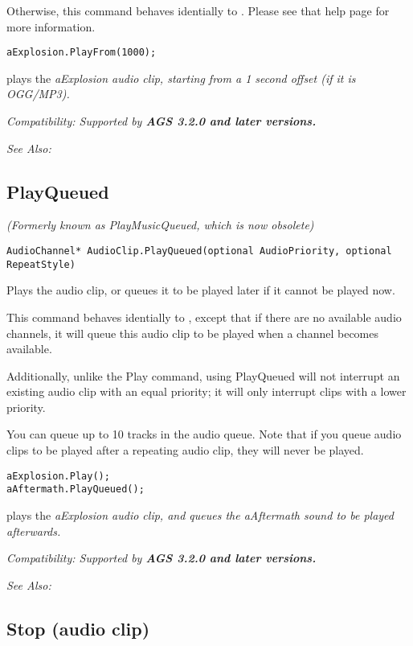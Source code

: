 Otherwise, this command behaves identially to .
Please see that help page for more information.

\begin{verbatim}
aExplosion.PlayFrom(1000);
\end{verbatim}
plays the \it{aExplosion} audio clip, starting from a 1 second offset (if it is OGG/MP3).

\it{Compatibility:} Supported by \bf{AGS 3.2.0} and later versions.

\it{See Also:} 


\subsection{PlayQueued}\label{AudioClip.PlayQueued}%

\it{(Formerly known as PlayMusicQueued, which is now obsolete)}

\begin{verbatim}
AudioChannel* AudioClip.PlayQueued(optional AudioPriority, optional RepeatStyle)
\end{verbatim}
Plays the audio clip, or queues it to be played later if it cannot be played now.

This command behaves identially to ,
except that if there are no available audio channels, it will queue this audio clip
to be played when a channel becomes available.

Additionally, unlike the Play command, using PlayQueued will not interrupt an existing audio
clip with an equal priority; it will only interrupt clips with a lower priority.

You can queue up to 10 tracks in the audio queue. Note that if you queue audio clips to
be played after a repeating audio clip, they will never be played.

\begin{verbatim}
aExplosion.Play();
aAftermath.PlayQueued();
\end{verbatim}
plays the \it{aExplosion} audio clip, and queues the \it{aAftermath} sound to be played
afterwards.

\it{Compatibility:} Supported by \bf{AGS 3.2.0} and later versions.

\it{See Also:} 


\subsection{Stop (audio clip)}\label{AudioClip.Stop}%

